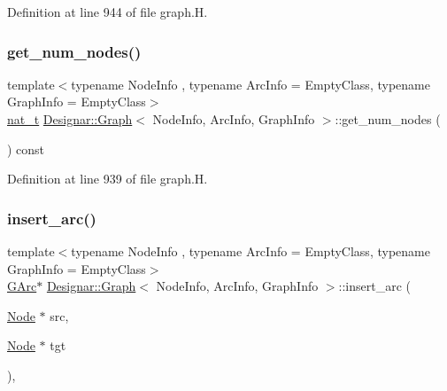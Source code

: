 Definition at line 944 of file graph.\+H.

\mbox{\label{class_designar_1_1_graph_af6f0ef48386dd1353880ff706387c4e8}} 
\subsubsection{\texorpdfstring{get\+\_\+num\+\_\+nodes()}{get\_num\_nodes()}}
{\footnotesize\ttfamily template$<$typename Node\+Info , typename Arc\+Info  = Empty\+Class, typename Graph\+Info  = Empty\+Class$>$ \\
\hyperlink{namespace_designar_aa72662848b9f4815e7bf31a7cf3e33d1}{nat\+\_\+t} \hyperlink{class_designar_1_1_graph}{Designar\+::\+Graph}$<$ Node\+Info, Arc\+Info, Graph\+Info $>$\+::get\+\_\+num\+\_\+nodes (\begin{DoxyParamCaption}{ }\end{DoxyParamCaption}) const\hspace{0.3cm}{\ttfamily [inline]}}



Definition at line 939 of file graph.\+H.

\mbox{\label{class_designar_1_1_graph_a20f183a1481fb62bc775aca6bd3244d1}} 
\subsubsection{\texorpdfstring{insert\+\_\+arc()}{insert\_arc()}\hspace{0.1cm}{\footnotesize\ttfamily [1/4]}}
{\footnotesize\ttfamily template$<$typename Node\+Info , typename Arc\+Info  = Empty\+Class, typename Graph\+Info  = Empty\+Class$>$ \\
\hyperlink{class_designar_1_1_graph_a5ad9e18b71899c2d4979426e367e5573}{G\+Arc}$\ast$ \hyperlink{class_designar_1_1_graph}{Designar\+::\+Graph}$<$ Node\+Info, Arc\+Info, Graph\+Info $>$\+::insert\+\_\+arc (\begin{DoxyParamCaption}\item[{\hyperlink{class_designar_1_1_graph_a5dfc7dba9d092ac489c72e40390c37d0}{Node} $\ast$}]{src,  }\item[{\hyperlink{class_designar_1_1_graph_a5dfc7dba9d092ac489c72e40390c37d0}{Node} $\ast$}]{tgt }\end{DoxyParamCaption})\hspace{0.3cm}{\ttfamily [inline]}, {\ttfamily [protected]}}




